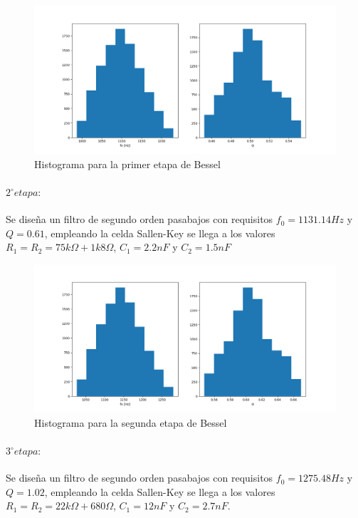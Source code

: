 \begin{figure}[H]
    \centering
    \includegraphics[scale=0.4]{../EJ1/Recursos/bessel_histogram_one.png}
    \caption{Histograma para la primer etapa de Bessel}
    \label{fig:bessel_histogram_one}
\end{figure}

\paragraph{$2^{\circ} etapa:$} Se dise\~na un filtro de segundo orden pasabajos con requisitos $f_0 = 1131.14Hz$ y $Q = 0.61$, empleando la celda Sallen-Key se llega a los valores $R_1 = R_2 = 75k \Omega + 1k8\Omega$, $C_1 = 2.2nF$ y $C_2 = 1.5nF$

\begin{figure}[H]
    \centering
    \includegraphics[scale=0.4]{../EJ1/Recursos/bessel_histogram_two.png}
    \caption{Histograma para la segunda etapa de Bessel}
    \label{fig:bessel_histogram_two}
\end{figure}

\paragraph{$3^{\circ} etapa:$} Se dise\~na un filtro de segundo orden pasabajos con requisitos $f_0 = 1275.48Hz$ y $Q = 1.02$, empleando la celda Sallen-Key se llega a los valores $R_1 = R_2 = 22k \Omega + 680\Omega$, $C_1 = 12nF$ y $C_2 = 2.7nF$.

